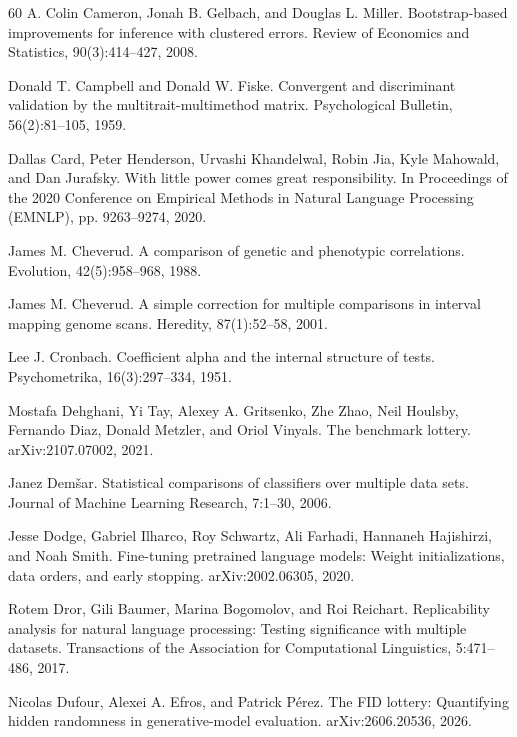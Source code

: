 \begin{thebibliography}{60}
A. Colin Cameron, Jonah B. Gelbach, and Douglas L. Miller. Bootstrap-based improvements for inference with clustered errors. Review of Economics and Statistics, 90(3):414--427, 2008.

Donald T. Campbell and Donald W. Fiske. Convergent and discriminant validation by the multitrait-multimethod matrix. Psychological Bulletin, 56(2):81--105, 1959.

Dallas Card, Peter Henderson, Urvashi Khandelwal, Robin Jia, Kyle Mahowald, and Dan Jurafsky. With little power comes great responsibility. In Proceedings of the 2020 Conference on Empirical Methods in Natural Language Processing (EMNLP), pp. 9263--9274, 2020.

James M. Cheverud. A comparison of genetic and phenotypic correlations. Evolution, 42(5):958--968, 1988.

James M. Cheverud. A simple correction for multiple comparisons in interval mapping genome scans. Heredity, 87(1):52--58, 2001.

Lee J. Cronbach. Coefficient alpha and the internal structure of tests. Psychometrika, 16(3):297--334, 1951.

Mostafa Dehghani, Yi Tay, Alexey A. Gritsenko, Zhe Zhao, Neil Houlsby, Fernando Diaz, Donald Metzler, and Oriol Vinyals. The benchmark lottery. arXiv:2107.07002, 2021.

Janez Dem\v{s}ar. Statistical comparisons of classifiers over multiple data sets. Journal of Machine Learning Research, 7:1--30, 2006.

Jesse Dodge, Gabriel Ilharco, Roy Schwartz, Ali Farhadi, Hannaneh Hajishirzi, and Noah Smith. Fine-tuning pretrained language models: Weight initializations, data orders, and early stopping. arXiv:2002.06305, 2020.

Rotem Dror, Gili Baumer, Marina Bogomolov, and Roi Reichart. Replicability analysis for natural language processing: Testing significance with multiple datasets. Transactions of the Association for Computational Linguistics, 5:471--486, 2017.

Nicolas Dufour, Alexei A. Efros, and Patrick P\'{e}rez. The FID lottery: Quantifying hidden randomness in generative-model evaluation. arXiv:2606.20536, 2026.


\end{thebibliography}

